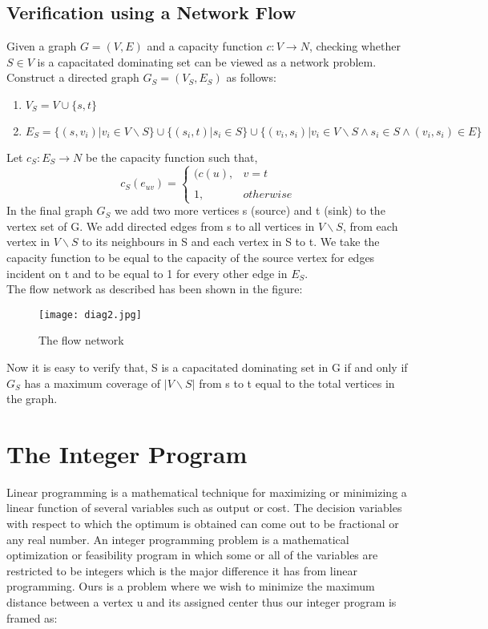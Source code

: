 \documentclass[12pt,a4paper,onecolumn]{article}
\begin{document}
\subsection{Verification using a Network Flow }
Given a graph $G = (V,E)$ and a capacity function $c : V \rightarrow N$, checking whether $S \in V$ is a capacitated dominating set can be viewed as a network problem. Construct a directed graph $G_S = (V_S,E_S)$ as follows:\begin{enumerate} 
\item $V_S = V \cup \{s,t\}$
\item $E_S = \{(s,v_i) | v_i \in V \backslash S \} \cup \{(s_i,t) | s_i \in S \}\cup \{(v_i,s_i) | v_i \in V \backslash S \wedge s_i \in S \wedge (v_i,s_i) \in E \}$\end{enumerate} Let $c_S : E_S \rightarrow N$ be the capacity function such that, $$c_S(e_{uv}) =\left\{ \begin{array}{cc}(c(u),  &  v = t \\\\ 1, & otherwise \end{array}\right.$$
In the final graph $G_S$ we add two more vertices s (source) and t (sink) to the vertex set of G. We add directed edges from s to all vertices in $V \backslash S$, from each vertex in $V \backslash S$ to its neighbours in S and each vertex in S to t. We take the capacity function to be equal to the capacity of the source vertex for edges incident on t and to be equal to 1 for every other edge in $E_S$. \\
The flow network as described has been shown in the figure:
\begin{flushleft}
 \begin{figure}[H]
 \begin{center}
 \texttt{[image: diag2.jpg]}
 \end{center}
  \caption{The flow network}
  \label{Figure 1}
\end{figure}
\end{flushleft}
  Now it is easy to verify that, S is a capacitated dominating set in G if and only if $G_S$ has a maximum coverage of $|V \backslash S|$ from s to t equal to the total vertices in the graph. 

\section{The Integer Program}
Linear programming is a mathematical technique for maximizing or minimizing a linear function of several variables such as output or cost. The decision variables with respect to which the optimum is obtained can come out to be fractional or any real number. An integer programming problem is a mathematical optimization or feasibility program in which
some or all of the variables are restricted to be integers which is the major difference it has from linear programming. Ours is a problem where we
wish to minimize the maximum distance between a vertex u and its assigned center thus our integer program is framed as:
\\
\end{document}
